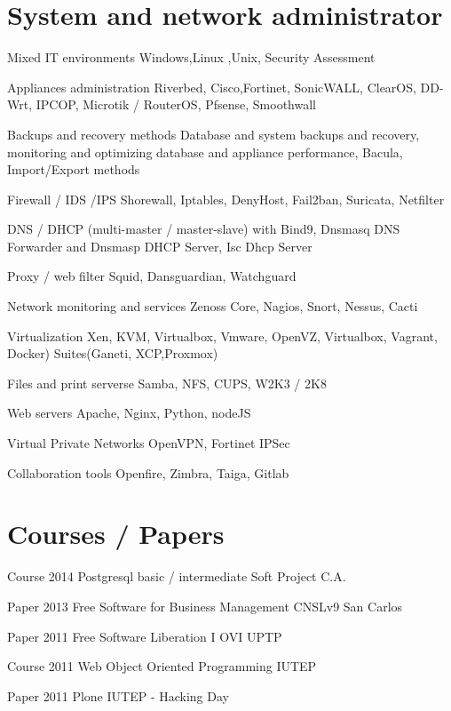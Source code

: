 \documentclass{tccv}
\begin{document}
\section{System and network administrator}
\begin{servicios}
\item{ }
     {Mixed IT environments}
     {Windows,Linux ,Unix, Security Assessment}
\item{ }
     {Appliances administration}
     {Riverbed, Cisco,Fortinet, SonicWALL, ClearOS, DD-Wrt, IPCOP, Microtik / RouterOS, Pfsense, Smoothwall}
\item{ }
     {Backups and recovery methods}
     {Database and system backups and recovery, monitoring and optimizing database and appliance performance, Bacula, Import/Export methods}
\item{}
     {Firewall / IDS /IPS}
     {Shorewall, Iptables, DenyHost, Fail2ban, Suricata, Netfilter}
\item{}
     {DNS / DHCP}
     {(multi-master / master-slave) with Bind9, Dnsmasq DNS Forwarder and Dnsmasp DHCP Server, Isc Dhcp Server}
\item{}
     {Proxy / web filter}
     {Squid, Dansguardian, Watchguard}
\item{}
     {Network monitoring and services}
     {Zenoss Core, Nagios, Snort, Nessus, Cacti}
\item{}
     {Virtualization}
     {Xen, KVM, Virtualbox, Vmware, OpenVZ, Virtualbox, Vagrant, Docker) Suites(Ganeti, XCP,Proxmox)}
\item{}
     {Files and print serverse}
     {Samba, NFS, CUPS, W2K3 / 2K8}
\item{}
     {Web servers}
     {Apache, Nginx, Python, nodeJS}
\item{}
     {Virtual Private Networks}
     {OpenVPN, Fortinet IPSec}
\item{}
     {Collaboration tools}
     {Openfire, Zimbra, Taiga, Gitlab}
\end{servicios}

\section{Courses / Papers}

\begin{cyp}

\item[Course]{2014}
     {Postgresql basic / intermediate}
     {Soft Project C.A.}

\item[Paper]{2013}
     {Free Software for Business Management}
     {CNSLv9 San Carlos}

\item[Paper]{2011}
     {Free Software Liberation}
     {I OVI UPTP}
     
\item[Course]{2011}
     {Web Object Oriented Programming}
     {IUTEP} 

\item[Paper]{2011}
     {Plone}
     {IUTEP - Hacking Day}

\end{cyp}
\end{document}
